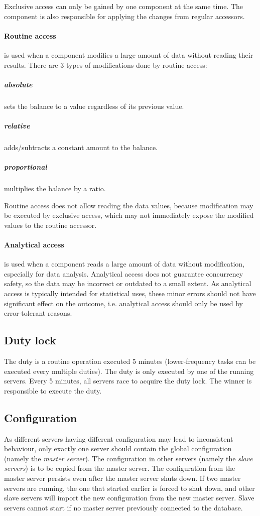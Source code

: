 \documentclass{report}
\begin{document}
					Exclusive access can only be gained by one component at the same time. The component is also responsible for applying the changes from regular accessors.

					\paragraph{Routine access} is used when a component modifies a large amount of data without reading their results. There are 3 types of modifications done by routine access:
						\subparagraph{absolute} sets the balance to a value regardless of its previous value.
						\subparagraph{relative} adds/subtracts a constant amount to the balance.
						\subparagraph{proportional} multiplies the balance by a ratio.

					Routine access does not allow reading the data values, because modification may be executed by exclusive access, which may not immediately expose the modified values to the routine accessor.

					\paragraph{Analytical access} is used when a component reads a large amount of data without modification, especially for data analysis. Analytical access does not guarantee concurrency safety, so the data may be incorrect or outdated to a small extent. As analytical access is typically intended for statistical uses, these minor errors should not have significant effect on the outcome, i.e. analytical access should only be used by error-tolerant reasons.

				\subsection{Duty lock}
					The duty is a routine operation executed 5 minutes (lower-frequency tasks can be executed every multiple duties). The duty is only executed by one of the running servers. Every 5 minutes, all servers race to acquire the duty lock. The winner is responsible to execute the duty.

				\subsection{Configuration}
					As different servers having different configuration may lead to inconsistent behaviour, only exactly one server should contain the global configuration (namely the \emph{master server}). The configuration in other servers (namely the \emph{slave servers}) is to be copied from the master server. The configuration from the master server persists even after the master server shuts down. If two master servers are running, the one that started earlier is forced to shut down, and other slave servers will import the new configuration from the new master server. Slave servers cannot start if no master server previously connected to the database.
\end{document}
